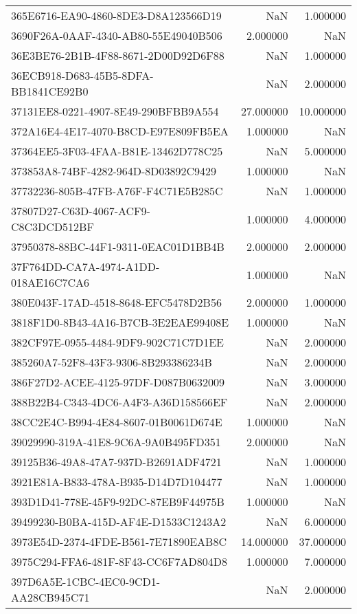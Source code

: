 \begin{tabular}{lrr}
365E6716-EA90-4860-8DE3-D8A123566D19 & NaN & 1.000000 \\
3690F26A-0AAF-4340-AB80-55E49040B506 & 2.000000 & NaN \\
36E3BE76-2B1B-4F88-8671-2D00D92D6F88 & NaN & 1.000000 \\
36ECB918-D683-45B5-8DFA-BB1841CE92B0 & NaN & 2.000000 \\
37131EE8-0221-4907-8E49-290BFBB9A554 & 27.000000 & 10.000000 \\
372A16E4-4E17-4070-B8CD-E97E809FB5EA & 1.000000 & NaN \\
37364EE5-3F03-4FAA-B81E-13462D778C25 & NaN & 5.000000 \\
373853A8-74BF-4282-964D-8D03892C9429 & 1.000000 & NaN \\
37732236-805B-47FB-A76F-F4C71E5B285C & NaN & 1.000000 \\
37807D27-C63D-4067-ACF9-C8C3DCD512BF & 1.000000 & 4.000000 \\
37950378-88BC-44F1-9311-0EAC01D1BB4B & 2.000000 & 2.000000 \\
37F764DD-CA7A-4974-A1DD-018AE16C7CA6 & 1.000000 & NaN \\
380E043F-17AD-4518-8648-EFC5478D2B56 & 2.000000 & 1.000000 \\
3818F1D0-8B43-4A16-B7CB-3E2EAE99408E & 1.000000 & NaN \\
382CF97E-0955-4484-9DF9-902C71C7D1EE & NaN & 2.000000 \\
385260A7-52F8-43F3-9306-8B293386234B & NaN & 2.000000 \\
386F27D2-ACEE-4125-97DF-D087B0632009 & NaN & 3.000000 \\
388B22B4-C343-4DC6-A4F3-A36D158566EF & NaN & 2.000000 \\
38CC2E4C-B994-4E84-8607-01B0061D674E & 1.000000 & NaN \\
39029990-319A-41E8-9C6A-9A0B495FD351 & 2.000000 & NaN \\
39125B36-49A8-47A7-937D-B2691ADF4721 & NaN & 1.000000 \\
3921E81A-B833-478A-B935-D14D7D104477 & NaN & 1.000000 \\
393D1D41-778E-45F9-92DC-87EB9F44975B & 1.000000 & NaN \\
39499230-B0BA-415D-AF4E-D1533C1243A2 & NaN & 6.000000 \\
3973E54D-2374-4FDE-B561-7E71890EAB8C & 14.000000 & 37.000000 \\
3975C294-FFA6-481F-8F43-CC6F7AD804D8 & 1.000000 & 7.000000 \\
397D6A5E-1CBC-4EC0-9CD1-AA28CB945C71 & NaN & 2.000000 \\

\end{tabular}
